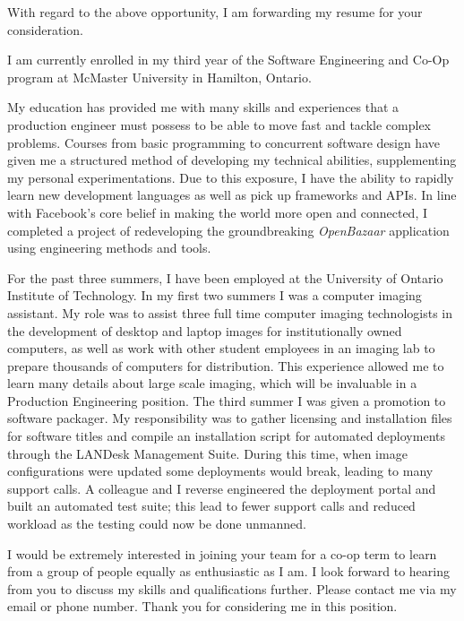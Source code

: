 \documentclass[11pt,a4paper,sans]{moderncv}        %
\begin{document}
\small{
With regard to the above opportunity, I am forwarding my resume for your consideration.

I am currently enrolled in my third year of the Software Engineering and Co-Op program at McMaster University in Hamilton, Ontario. 

My education has provided me with many skills and experiences that a production engineer must possess to be able to move fast and tackle complex problems. Courses from basic programming to concurrent software design have given me a structured method of developing my technical abilities, supplementing my personal experimentations. Due to this exposure, I have the ability to rapidly learn new development languages as well as pick up frameworks and APIs. In line with Facebook's core belief in making the world more open and connected, I completed a project of redeveloping the groundbreaking \textit{OpenBazaar} application using engineering methods and tools. 

For the past three summers, I have been employed at the University of Ontario Institute of Technology. In my first two summers I was a computer imaging assistant. My role was to assist three full time computer imaging technologists in the development of desktop and laptop images for institutionally owned computers, as well as work with other student employees in an imaging lab to prepare thousands of computers for distribution. This experience allowed me to learn many details about large scale imaging, which will be invaluable in a Production Engineering position. The third summer I was given a promotion to software packager. My responsibility was to gather licensing and installation files for software titles and compile an installation script for automated deployments through the LANDesk Management Suite. During this time, when image configurations were updated some deployments would break, leading to many support calls. A colleague and I reverse engineered the deployment portal and built an automated test suite; this lead to fewer support calls and reduced workload as the testing could now be done unmanned.


I would be extremely interested in joining your team for a co-op term to learn from a group of people equally as enthusiastic as I am. I look forward to hearing from you to discuss my skills and qualifications further. Please contact me via my email or phone number. Thank you for considering me in this position.}


\makeletterclosing
\end{document}
